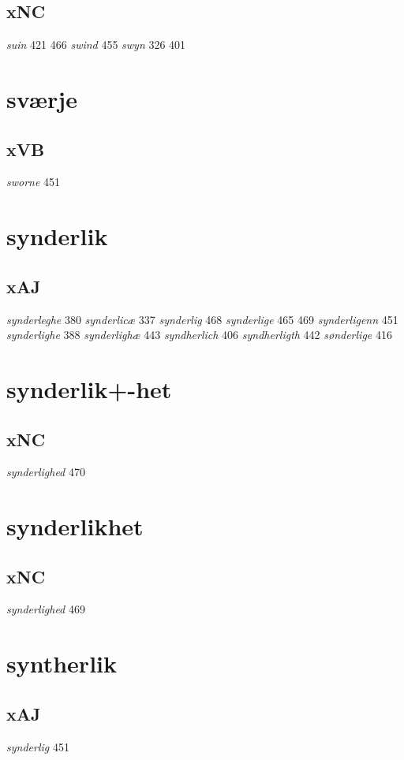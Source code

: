 \documentclass[a4paper,twocolumn]{article}
\begin{document}
\subsection{xNC}
\label{sec:org0efebc7}
\emph{suin} 421 466 \emph{swind} 455 \emph{swyn} 326 401 
\section{sværje}
\label{sec:org3a623b7}
\subsection{xVB}
\label{sec:orgd726ab9}
\emph{sworne} 451 
\section{synderlik}
\label{sec:org1b768ec}
\subsection{xAJ}
\label{sec:org3bbcbd5}
\emph{synderleghe} 380 \emph{synderlicæ} 337 \emph{synderlig} 468 \emph{synderlige} 465 469 \emph{synderligenn} 451 \emph{synderlighe} 388 \emph{synderlighæ} 443 \emph{syndherlich} 406 \emph{syndherligth} 442 \emph{sønderlige} 416 
\section{synderlik+-het}
\label{sec:org27411fa}
\subsection{xNC}
\label{sec:orgaec506d}
\emph{synderlighed} 470 
\section{synderlikhet}
\label{sec:org011bf50}
\subsection{xNC}
\label{sec:orgc167f22}
\emph{synderlighed} 469 
\section{syntherlik}
\label{sec:org150af73}
\subsection{xAJ}
\label{sec:org78d10f7}
\emph{synderlig} 451 
\end{document}
